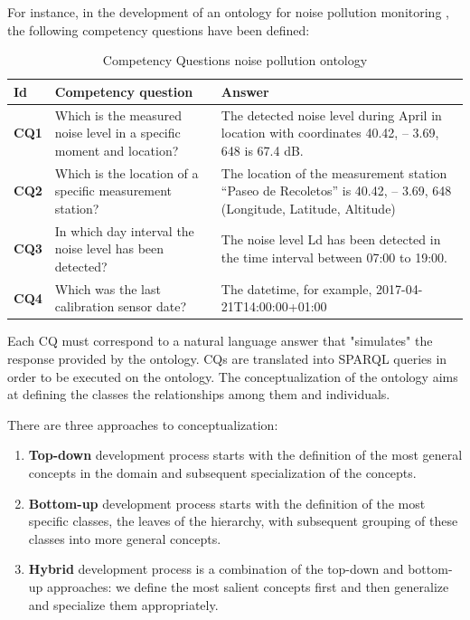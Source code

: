 For instance, in the development of an ontology for noise pollution monitoring \cite{espinoza2020using}, the following competency questions have been defined:
\begin{table}[H]
    \centering
    \begin{tabular}{|>{\raggedright\arraybackslash}p{1cm}|>{\raggedright\arraybackslash}p{6cm}|>{\raggedright\arraybackslash}p{6cm}|}
        \hline
        \textbf{Id} & \textbf{Competency question} & \textbf{Answer} \\ \hline
        \textbf{CQ1} & Which is the measured noise level in a specific moment and location? & The detected noise level during April in location with coordinates 40.42, – 3.69, 648 is 67.4 dB. \\ \hline
        \textbf{CQ2} & Which is the location of a specific measurement station? & The location of the measurement station “Paseo de Recoletos” is 40.42, – 3.69, 648 (Longitude, Latitude, Altitude) \\ \hline
        \textbf{CQ3} & In which day interval the noise level has been detected? & The noise level Ld has been detected in the time interval between 07:00 to 19:00. \\ \hline
        \textbf{CQ4} & Which was the last calibration sensor date? & The datetime, for example, 2017-04-21T14:00:00+01:00 \\ \hline
    \end{tabular}
    \caption{Competency Questions noise pollution ontology}
\end{table}
Each CQ must correspond to a natural language answer that "simulates" the response provided by the ontology.
CQs are translated into SPARQL queries in order to be executed on the ontology.
The conceptualization of the ontology aims at defining the classes the relationships among them and individuals. 

There are three approaches to conceptualization:
\begin{enumerate}
    \item \textbf{Top-down} development process starts with the definition of the most general concepts in the domain and subsequent specialization of the concepts.
    
    \item \textbf{Bottom-up} development process starts with the definition of the most specific classes, the leaves of the hierarchy, with subsequent grouping of these classes into more general concepts.
    
    \item \textbf{Hybrid} development process is a combination of the top-down and bottom-up approaches: we define the most salient concepts first and then generalize and specialize them appropriately.
    
\end{enumerate}

